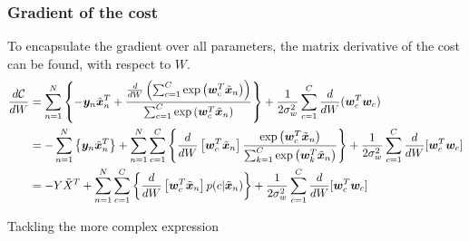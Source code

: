 \documentclass[../../main.tex]{subfiles}
\begin{document}
\subsubsection{Gradient of the cost}

To encapsulate the gradient over all parameters, the matrix derivative of the cost can be found, with respect to $W$.
\begin{align*}
\frac{d\mathcal{C}}{dW}
&=
\sum_{n=1}^N \left\{ -\bm{y}_n \tilde{\bm{x}}_n^T
+ \frac
    {\frac{d}{dW}\left(\sum_{c=1}^C \exp{\left( \bm{w} _c^T\tilde{ \bm{x} }_n\right)}\right)}
    {\sum_{c=1}^C \exp{\left( \bm{w} _c^T\tilde{ \bm{x} }_n\right)}}
\right\}
+ \frac{1}{2\sigma_w^2} \sum_{c=1}^C \frac{d}{dW}(\bm{w}_c^T\bm{w}_c) \\
&=
- \sum_{n=1}^N \left\{ \bm{y}_n \tilde{\bm{x}}_n^T \right\}
+ \sum_{n=1}^N \sum_{c=1}^C \left\{
    \frac{d}{dW}\left[\bm{w}_c^T\tilde{\bm{x}}_n \right]
    \frac
        {\exp{\left( \bm{w} _c^T\tilde{ \bm{x} }_n\right)}}
    {\sum_{k=1}^C \exp{\left( \bm{w} _k^T\tilde{ \bm{x} }_n\right)}}
\right\}
+ \frac{1}{2\sigma_w^2} \sum_{c=1}^C \frac{d}{dW}[\bm{w}_c^T\bm{w}_c] \\
&=
- Y\tilde{X}^T
+ \sum_{n=1}^N \sum_{c=1}^C \left\{
    \frac{d}{dW}\left[\bm{w}_c^T\tilde{\bm{x}}_n \right]
    p(c|\tilde{\bm{x}}_n)
\right\}
+ \frac{1}{2\sigma_w^2} \sum_{c=1}^C \frac{d}{dW}[\bm{w}_c^T\bm{w}_c] \\
\end{align*}

Tackling the more complex expression
\end{document}
